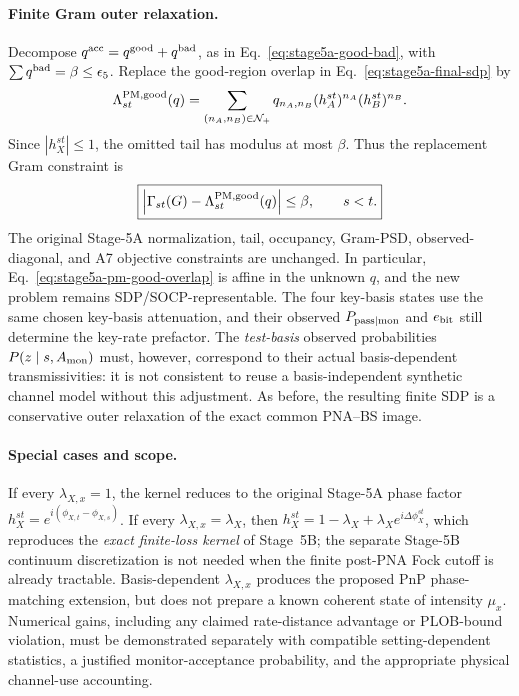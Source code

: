 \documentclass[11pt]{article}
\theoremstyle{remark}
\begin{document}
\paragraph{Finite Gram outer relaxation.}
Decompose \(q^{\rm acc}=q^{\rm good}+q^{\rm bad}\), as in
Eq.~\eqref{eq:stage5a-good-bad}, with
\(\sum q^{\rm bad}=\beta\le\epsilon_5\).
Replace the good-region overlap in
Eq.~\eqref{eq:stage5a-final-sdp} by
\begin{equation}
  \Lambda_{st}^{\rm PM,good}(q)
  =
  \sum_{(n_A,n_B)\in\mathcal N_+}
  q_{n_A,n_B}
  (h_A^{st})^{n_A}(h_B^{st})^{n_B}.
  \label{eq:stage5a-pm-good-overlap}
\end{equation}
Since \(|h_X^{st}|\le1\), the omitted tail has modulus at most
\(\beta\).  Thus the replacement Gram constraint is
\begin{equation}
  \boxed{
  \left|\Gamma_{st}(G)-\Lambda_{st}^{\rm PM,good}(q)\right|
  \le\beta,\qquad s<t .
  }
  \label{eq:stage5a-pm-gram-soc}
\end{equation}
The original Stage-5A normalization, tail, occupancy, Gram-PSD,
observed-diagonal, and A7 objective constraints are unchanged.
In particular, Eq.~\eqref{eq:stage5a-pm-good-overlap} is affine in the
unknown \(q\), and the new problem remains SDP/SOCP-representable.
The four key-basis states use the same chosen key-basis attenuation,
and their observed \(P_{\rm pass|mon}\) and \(e_{\rm bit}\) still
determine the key-rate prefactor.  The \emph{test-basis} observed
probabilities \(P(z\mid s,A_{\rm mon})\) must, however, correspond to
their actual basis-dependent transmissivities: it is not consistent
to reuse a basis-independent synthetic channel model without this
adjustment.  As before, the resulting finite SDP is a conservative
outer relaxation of the exact common PNA--BS image.

\paragraph{Special cases and scope.}
If every \(\lambda_{X,x}=1\), the kernel reduces to the original
Stage-5A phase factor
\(h_X^{st}=e^{i(\phi_{X,t}-\phi_{X,s})}\).
If every \(\lambda_{X,x}=\lambda_X\), then
\(h_X^{st}=1-\lambda_X+\lambda_Xe^{i\Delta\phi_X^{st}}\),
which reproduces the \emph{exact finite-loss kernel} of Stage~5B;
the separate Stage-5B continuum discretization is not needed when
the finite post-PNA Fock cutoff is already tractable.
Basis-dependent \(\lambda_{X,x}\) produces the proposed PnP
phase-matching extension, but does not prepare a known
coherent state of intensity \(\mu_x\).  Numerical gains, including
any claimed rate-distance advantage or PLOB-bound violation,
must be demonstrated separately with compatible
setting-dependent statistics, a justified monitor-acceptance
probability, and the appropriate physical channel-use accounting.
\end{document}
